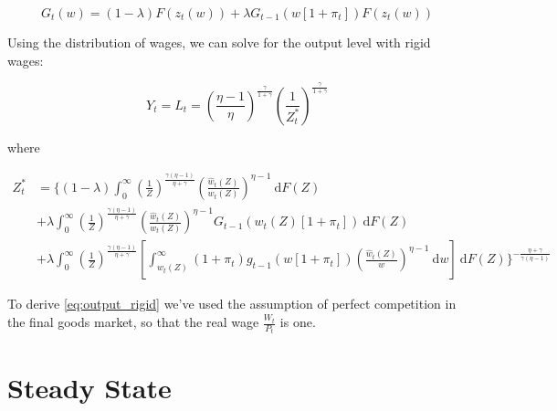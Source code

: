 \documentclass[12pt,a4paper]{scrartcl}            %
\begin{document}
\begin{equation}
    \label{eq:wage_distribution}
    G_t(w) = (1 - \lambda) F(z_t(w)) + \lambda G_{t-1}\left(w[1 + \pi_t]\right)F(z_t(w))
\end{equation}

Using the distribution of wages, we can solve for the output level with rigid wages:

\begin{equation}
    \label{eq:output_rigid}
    Y_t = L_t = \left(\frac{\eta - 1}{\eta} \right)^{\frac{\gamma}{1 + \gamma}}\left( \frac{1}{Z_t^*} \right)^{\frac{\gamma}{1 + \gamma}}
\end{equation}

where

\begin{equation}
    \label{eq:z_star}
    \begin{split}
    Z_t^* &= \Big\{(1 - \lambda) \int_{0}^{\infty} \! \left( \frac{1}{Z} \right)^{\frac{\gamma(\eta - 1)}{\eta + \gamma}} \left( \frac{\hat{w}_t(Z)}{w_t(Z)} \right)^{\eta - 1}\ \mathrm{d}F(Z) \\
          &+            \lambda  \int_{0}^{\infty} \! \left( \frac{1}{Z} \right)^{\frac{\gamma(\eta - 1)}{\eta + \gamma}} \left( \frac{\hat{w}_t(Z)}{w_t(Z)} \right)^{\eta - 1} G_{t-1}\left( w_t(Z)[1 + \pi_t] \right)                                                     \ \mathrm{d}F(Z)\\
          &+            \lambda  \int_{0}^{\infty} \! \left( \frac{1}{Z} \right)^{\frac{\gamma(\eta - 1)}{\eta + \gamma}} \left[ \int_{w_t(Z)}^{\infty} (1 + \pi_t)g_{t-1}\left( w[1 + \pi_t] \right) \left( \frac{\hat{w}_t(Z)}{w} \right)^{\eta - 1}\ \mathrm{d}w \right] \ \mathrm{d}F(Z)
            \Big\}^{-\frac{\eta + \gamma}{\gamma(\eta - 1)}}
    \end{split}
\end{equation}

To derive \ref{eq:output_rigid} we've used the assumption of perfect competition in the final goods market, so that the real wage $\frac{W_t}{P_t}$ is one.


\section{Steady State}
\label{sec:steady_state}




\end{document}
